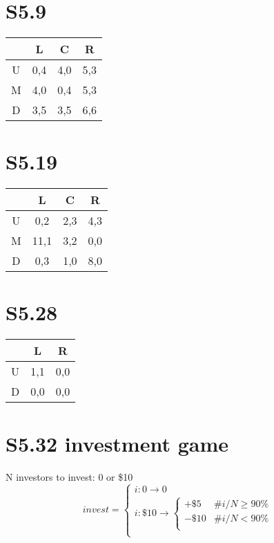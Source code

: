 \documentclass[12pt,a4paper]{article}
\begin{document}
\section{S5.9}
\begin{center}
\begin{tabular}{c|ccc}
 & L & C & R \\
 \hline
 U & 0,4 & 4,0 & 5,3 \\
 M & 4,0 & 0,4 & 5,3 \\
 D & 3,5 & 3,5 & 6,6 \\
\end{tabular}
\end{center}

\section{S5.19}
\begin{center}
\begin{tabular}{c|ccc}
 & L & C & R \\
 \hline
 U & 0,2 & 2,3 & 4,3 \\
 M & 11,1 & 3,2 & 0,0 \\
 D & 0,3 & 1,0 & 8,0 \\
\end{tabular}
\end{center}


\section{S5.28}
\begin{center}
\begin{tabular}{c|cc}
 & L & R \\
 \hline
 U & 1,1 & 0,0 \\
 D & 0,0 & 0,0 \\
\end{tabular}
\end{center}


\section{S5.32 investment game}
N investors to invest: 0 or \$10
\[
invest = \left\{
\begin{array}{l}
i:0 \rightarrow 0 \\

i:\$10 \rightarrow \left\{
\begin{array}{ll}
	+\$5 & \#i/N \geqslant 90\% \\
	-\$10 & \#i/N < 90\% \\
\end{array}\right. \\
\end{array}\right.
\]
\end{document}
